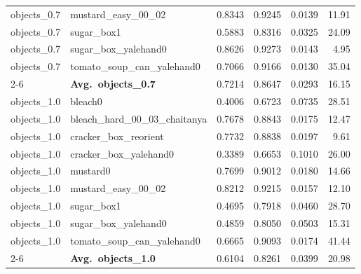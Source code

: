 \begin{longtable}{llrrrr}
  objects_0.7 & mustard\_easy\_00\_02 & 0.8343 & 0.9245 & 0.0139 & 11.91 \\
  objects_0.7 & sugar\_box1 & 0.5883 & 0.8316 & 0.0325 & 24.09 \\
  objects_0.7 & sugar\_box\_yalehand0 & 0.8626 & 0.9273 & 0.0143 & 4.95 \\
  objects_0.7 & tomato\_soup\_can\_yalehand0 & 0.7066 & 0.9166 & 0.0130 & 35.04 \\
  \cmidrule{2-6}
  & \textbf{Avg.~objects_0.7} & 0.7214 & 0.8647 & 0.0293 & 16.15 \\
  \midrule
  objects_1.0 & bleach0 & 0.4006 & 0.6723 & 0.0735 & 28.51 \\
  objects_1.0 & bleach\_hard\_00\_03\_chaitanya & 0.7678 & 0.8843 & 0.0175 & 12.47 \\
  objects_1.0 & cracker\_box\_reorient & 0.7732 & 0.8838 & 0.0197 & 9.61 \\
  objects_1.0 & cracker\_box\_yalehand0 & 0.3389 & 0.6653 & 0.1010 & 26.00 \\
  objects_1.0 & mustard0 & 0.7699 & 0.9012 & 0.0180 & 14.66 \\
  objects_1.0 & mustard\_easy\_00\_02 & 0.8212 & 0.9215 & 0.0157 & 12.10 \\
  objects_1.0 & sugar\_box1 & 0.4695 & 0.7918 & 0.0460 & 28.70 \\
  objects_1.0 & sugar\_box\_yalehand0 & 0.4859 & 0.8050 & 0.0503 & 15.31 \\
  objects_1.0 & tomato\_soup\_can\_yalehand0 & 0.6665 & 0.9093 & 0.0174 & 41.44 \\
  \cmidrule{2-6}
  & \textbf{Avg.~objects_1.0} & 0.6104 & 0.8261 & 0.0399 & 20.98 \\
  \midrule
\bottomrule
\end{longtable}